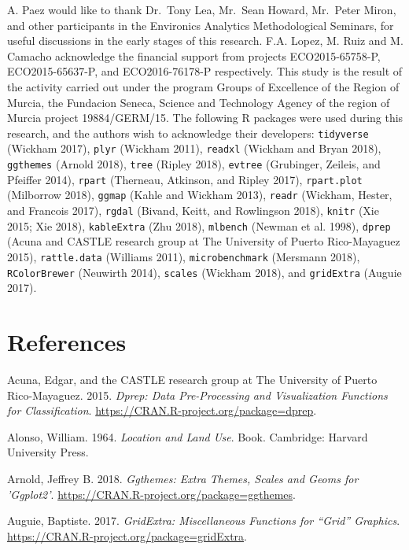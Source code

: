 \documentclass[]{elsarticle} %
\begin{document}
A. Paez would like to thank Dr.~Tony Lea, Mr.~Sean Howard, Mr.~Peter
Miron, and other participants in the Environics Analytics Methodological
Seminars, for useful discussions in the early stages of this research.
F.A. Lopez, M. Ruiz and M. Camacho acknowledge the financial support
from projects ECO2015-65758-P, ECO2015-65637-P, and ECO2016-76178-P
respectively. This study is the result of the activity carried out under
the program Groups of Excellence of the Region of Murcia, the Fundacion
Seneca, Science and Technology Agency of the region of Murcia project
19884/GERM/15. The following R packages were used during this research,
and the authors wish to acknowledge their developers: \texttt{tidyverse}
(Wickham 2017), \texttt{plyr} (Wickham 2011), \texttt{readxl} (Wickham
and Bryan 2018), \texttt{ggthemes} (Arnold 2018), \texttt{tree} (Ripley
2018), \texttt{evtree} (Grubinger, Zeileis, and Pfeiffer 2014),
\texttt{rpart} (Therneau, Atkinson, and Ripley 2017),
\texttt{rpart.plot} (Milborrow 2018), \texttt{ggmap} (Kahle and Wickham
2013), \texttt{readr} (Wickham, Hester, and Francois 2017),
\texttt{rgdal} (Bivand, Keitt, and Rowlingson 2018), \texttt{knitr} (Xie
2015; Xie 2018), \texttt{kableExtra} (Zhu 2018), \texttt{mlbench}
(Newman et al. 1998), \texttt{dprep} (Acuna and CASTLE research group at
The University of Puerto Rico-Mayaguez 2015), \texttt{rattle.data}
(Williams 2011), \texttt{microbenchmark} (Mersmann 2018),
\texttt{RColorBrewer} (Neuwirth 2014), \texttt{scales} (Wickham 2018),
and \texttt{gridExtra} (Auguie 2017).

\section*{References}\label{references}

\hypertarget{refs}{}
\hypertarget{ref-Acuna2015}{}
Acuna, Edgar, and the CASTLE research group at The University of Puerto
Rico-Mayaguez. 2015. \emph{Dprep: Data Pre-Processing and Visualization
Functions for Classification}.
\url{https://CRAN.R-project.org/package=dprep}.

\hypertarget{ref-Alonso1964}{}
Alonso, William. 1964. \emph{Location and Land Use}. Book. Cambridge:
Harvard University Press.

\hypertarget{ref-Arnold2018}{}
Arnold, Jeffrey B. 2018. \emph{Ggthemes: Extra Themes, Scales and Geoms
for 'Ggplot2'}. \url{https://CRAN.R-project.org/package=ggthemes}.

\hypertarget{ref-Auguie2017}{}
Auguie, Baptiste. 2017. \emph{GridExtra: Miscellaneous Functions for
``Grid'' Graphics}. \url{https://CRAN.R-project.org/package=gridExtra}.
\end{document}
